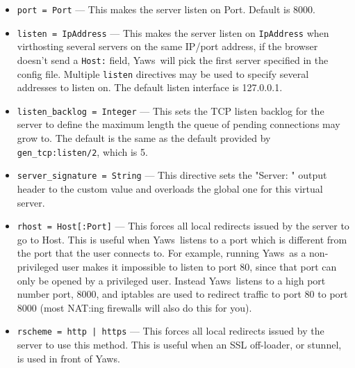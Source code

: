 \documentclass[11pt,oneside,english]{book}
\newcommand{\Yaws}            %
        {{\sc Yaws}}
\begin{document}
\begin{itemize}

\item       \verb+port = Port+ ---
              This makes the server listen on Port. Default is 8000.

\item        \verb+listen = IpAddress+ ---
              This makes the server listen on \verb+IpAddress+ when
              virthosting several servers on the same IP/port address, if
              the browser doesn't send a \verb+Host:+ field, \Yaws\ will
              pick the first server specified in the config file. Multiple
              \verb+listen+ directives may be used to specify several
              addresses to listen on. The default listen interface is
              127.0.0.1.

\item        \verb+listen_backlog = Integer+ ---
              This sets the TCP listen backlog for the server to
              define the maximum length the queue of pending
              connections may grow to. The default is the same as
              the default provided by \verb+gen_tcp:listen/2+, which
              is 5.

\item        \verb+server_signature = String+ ---
              This directive sets the "Server: " output header to the custom
              value and overloads the global one for this virtual server.

\item       \verb+rhost = Host[:Port]+ ---
             This forces all local redirects issued by the server to go to Host.
             This is useful when \Yaws\ listens to a port which is different
             from the port that the user connects to. For example, running
             \Yaws\ as a non-privileged user makes it impossible to listen to
             port 80, since that port can only be opened by a privileged
             user. Instead \Yaws\ listens to a high port number port, 8000, and
             iptables are used to redirect traffic to port 80 to port 8000 (most
             NAT:ing firewalls will also do this for you).

\item       \verb+rscheme = http | https+ ---
              This forces  all  local  redirects  issued  by  the
              server  to  use this method. This is useful when an
              SSL off-loader, or stunnel, is  used  in  front  of
              \Yaws{}.


\end{itemize}
\end{document}
